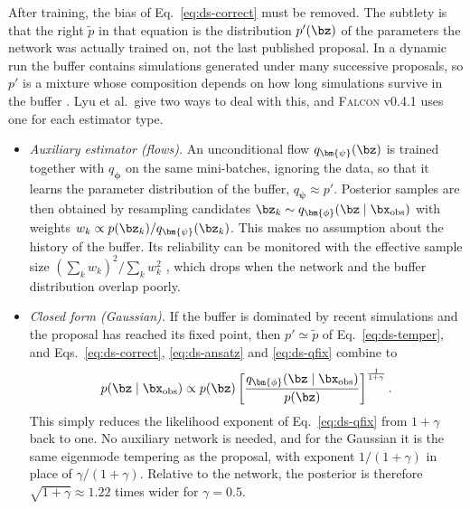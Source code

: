After training, the bias of Eq.~\eqref{eq:ds-correct} must be removed. The
subtlety is that the right $\tilde p$ in that equation is the distribution
$p'(\bz)$ of the parameters the network was actually trained on, not the last
published proposal. In a dynamic run the buffer contains simulations
generated under many successive proposals, so $p'$ is a mixture whose
composition depends on how long simulations survive in the buffer
\citep{lyu_dynamic_2026}. Lyu et al.\ give two ways to deal with this, and
\textsc{Falcon} v0.4.1 uses one for each estimator type.
\begin{itemize}
    \item \emph{Auxiliary estimator (flows).} An unconditional flow
          $q_{\bm{\psi}}(\bz)$ is trained together with $q_{\bm{\phi}}$ on the
          same mini-batches, ignoring the data, so that it learns the
          parameter distribution of the buffer, $q_{\bm{\psi}}\approx p'$.
          Posterior samples are then obtained by resampling candidates
          $\bz_k\sim q_{\bm{\phi}}(\bz\mid\bx_{\mathrm{obs}})$ with weights
          $w_k\propto p(\bz_k)/q_{\bm{\psi}}(\bz_k)$. This makes no assumption
          about the history of the buffer. Its reliability can be monitored
          with the effective sample size $(\sum_k w_k)^2/\sum_k w_k^2$
          \citep{kish_survey_1965}, which drops when the network and the
          buffer distribution overlap poorly.
    \item \emph{Closed form (Gaussian).} If the buffer is dominated by recent
          simulations and the proposal has reached its fixed point, then
          $p'\simeq\tilde p$ of Eq.~\eqref{eq:ds-temper}, and
          Eqs.~\eqref{eq:ds-correct}, \eqref{eq:ds-ansatz} and \eqref{eq:ds-qfix}
          combine to
          \begin{equation}
              p(\bz\mid\bx_{\mathrm{obs}})\propto p(\bz)
              \left[\frac{q_{\bm{\phi}}(\bz\mid\bx_{\mathrm{obs}})}{p(\bz)}\right]^{\frac{1}{1+\gamma}}.
              \label{eq:ds-post}
          \end{equation}
          This simply reduces the likelihood exponent of
          Eq.~\eqref{eq:ds-qfix} from $1+\gamma$ back to one. No auxiliary
          network is needed, and for the Gaussian it is the same eigenmode
          tempering as the proposal, with exponent $1/(1+\gamma)$ in place of
          $\gamma/(1+\gamma)$. Relative to the network, the posterior is
          therefore $\sqrt{1+\gamma}\approx1.22$ times wider for
          $\gamma=0.5$.
\end{itemize}

